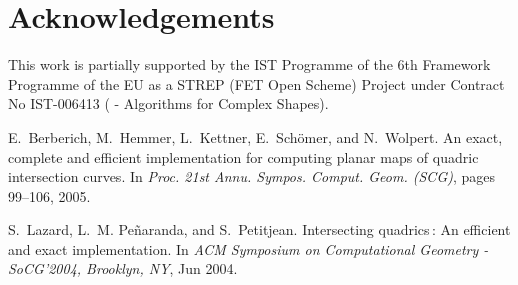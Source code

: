 
\section{Acknowledgements}

This work is partially supported by the IST Programme of the 6th
Framework Programme of the EU as a STREP (FET Open Scheme) Project
under Contract No IST-006413 ( -
Algorithms for Complex Shapes).

\begin{thebibliography}{10}

E.~Berberich, M.~Hemmer, L.~Kettner, E.~Sch{\"o}mer, and N.~Wolpert.
\newblock An exact, complete and efficient implementation for computing planar
  maps of quadric intersection curves.
\newblock In {\em Proc. 21st Annu. Sympos. Comput. Geom. (SCG)}, pages 99--106,
  2005.

S.~Lazard, L.~M. Pe{\~n}aranda, and S.~Petitjean.
\newblock Intersecting quadrics\,: An efficient and exact implementation.
\newblock In {\em {ACM Symposium on Computational Geometry - SoCG'2004,
  Brooklyn, NY}}, Jun 2004.

\end{thebibliography}
